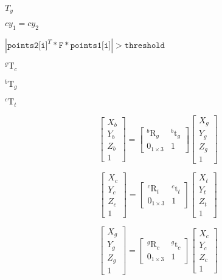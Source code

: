 \documentclass{article}
\begin{document}
$T_y$
\pagebreak

$cy_1=cy_2$
\pagebreak

$|\texttt{points2[i]}^T*\texttt{F}*\texttt{points1[i]}|>\texttt{threshold}$
\pagebreak

$_{}^{g}\textrm{T}_c$
\pagebreak

$_{}^{b}\textrm{T}_g$
\pagebreak

$_{}^{c}\textrm{T}_t$
\pagebreak

\[ \begin{bmatrix} X_b\\ Y_b\\ Z_b\\ 1 \end{bmatrix} = \begin{bmatrix} _{}^{b}\textrm{R}_g & _{}^{b}\textrm{t}_g \\ 0_{1 \times 3} & 1 \end{bmatrix} \begin{bmatrix} X_g\\ Y_g\\ Z_g\\ 1 \end{bmatrix} \]
\pagebreak

\[ \begin{bmatrix} X_c\\ Y_c\\ Z_c\\ 1 \end{bmatrix} = \begin{bmatrix} _{}^{c}\textrm{R}_t & _{}^{c}\textrm{t}_t \\ 0_{1 \times 3} & 1 \end{bmatrix} \begin{bmatrix} X_t\\ Y_t\\ Z_t\\ 1 \end{bmatrix} \]
\pagebreak

\[ \begin{bmatrix} X_g\\ Y_g\\ Z_g\\ 1 \end{bmatrix} = \begin{bmatrix} _{}^{g}\textrm{R}_c & _{}^{g}\textrm{t}_c \\ 0_{1 \times 3} & 1 \end{bmatrix} \begin{bmatrix} X_c\\ Y_c\\ Z_c\\ 1 \end{bmatrix} \]
\pagebreak
\end{document}
